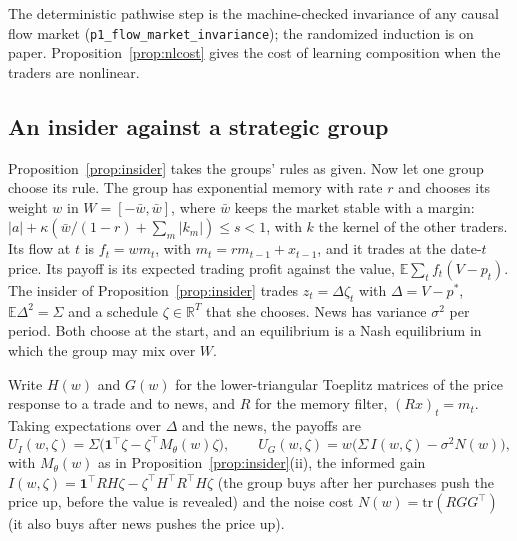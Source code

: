 The deterministic pathwise step is the machine-checked invariance of any causal flow market (\texttt{p1\_flow\_market\_invariance}); the randomized induction is on paper. Proposition~\ref{prop:nlcost} gives the cost of learning composition when the traders are nonlinear.

\subsection{An insider against a strategic group}

Proposition~\ref{prop:insider} takes the groups' rules as given. Now let one group choose its rule. The group has exponential memory with rate $r$ and chooses its weight $w$ in $W=[-\bar w,\bar w]$, where $\bar w$ keeps the market stable with a margin: $|a|+\kappa(\bar w/(1-r)+\sum_m|k_m|)\le s<1$, with $k$ the kernel of the other traders. Its flow at $t$ is $f_t=wm_t$, with $m_t=rm_{t-1}+x_{t-1}$, and it trades at the date-$t$ price. Its payoff is its expected trading profit against the value, $\mathbb E\sum_tf_t(V-p_t)$. The insider of Proposition~\ref{prop:insider} trades $z_t=\Delta\zeta_t$ with $\Delta=V-p^*$, $\mathbb E\Delta^2=\Sigma$ and a schedule $\zeta\in\mathbb R^T$ that she chooses. News has variance $\sigma^2$ per period. Both choose at the start, and an equilibrium is a Nash equilibrium in which the group may mix over $W$.

Write $H(w)$ and $G(w)$ for the lower-triangular Toeplitz matrices of the price response to a trade and to news, and $R$ for the memory filter, $(R x)_t=m_t$. Taking expectations over $\Delta$ and the news, the payoffs are
\[
U_I(w,\zeta)=\Sigma\bigl(\mathbf 1^\top\zeta-\zeta^\top M_\theta(w)\zeta\bigr),\qquad
U_G(w,\zeta)=w\bigl(\Sigma\,I(w,\zeta)-\sigma^2N(w)\bigr),
\]
with $M_\theta(w)$ as in Proposition~\ref{prop:insider}(ii), the informed gain $I(w,\zeta)=\mathbf 1^\top RH\zeta-\zeta^\top H^\top R^\top H\zeta$ (the group buys after her purchases push the price up, before the value is revealed) and the noise cost $N(w)=\mathrm{tr}(RGG^\top)$ (it also buys after news pushes the price up).

